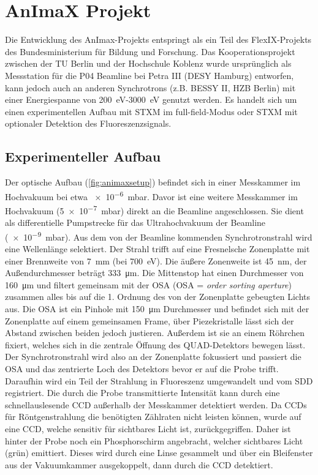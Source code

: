 \section{AnImaX Projekt}
Die Entwicklung des AnImax-Projekts entspringt als ein Teil des FlexIX-Projekts des Bundesministerium für Bildung und Forschung. Das Kooperationsprojekt zwischen der TU Berlin und der Hochschule Koblenz wurde ursprünglich als Messstation für die P04 Beamline bei Petra III (DESY Hamburg) entworfen, kann jedoch auch an anderen Synchrotrons (z.B. BESSY II, HZB Berlin) mit einer Energiespanne von \SI{200}{\electronvolt}-\SI{3000}{\electronvolt} genutzt werden. Es handelt sich um einen experimentellen Aufbau mit STXM im full-field-Modus oder STXM mit optionaler Detektion des Fluoreszenzsignals.
\subsection{Experimenteller Aufbau}
Der optische Aufbau (\cref{fig:animaxsetup}) befindet sich in einer Messkammer im Hochvakuum bei etwa \SI{e-6}{\milli\bar}. Davor ist eine weitere Messkammer im Hochvakuum (\SI{5e-7}{\milli\bar}) direkt an die Beamline angeschlossen. Sie dient als differentielle Pumpstrecke für das Ultrahochvakuum der Beamline (\SI{e-9}{\milli\bar}). Aus dem von der Beamline kommenden Synchrotronstrahl wird eine Wellenlänge selektiert. Der Strahl trifft auf eine Fresnelsche Zonenplatte mit einer Brennweite von \SI{7}{\milli\meter} (bei \SI{700}{\electronvolt}). Die äußere Zonenweite ist \SI{45}{\nano\meter}, der Außendurchmesser beträgt \SI{333}{\micro\meter}. Die Mittenstop hat einen Durchmesser von \SI{160}{\micro\meter} und filtert gemeinsam mit der OSA (OSA = \textit{order sorting aperture}) zusammen alles bis auf die 1. Ordnung des von der Zonenplatte gebeugten Lichts aus. Die OSA ist ein Pinhole mit \SI{150}{\micro\meter} Durchmesser und befindet sich mit der Zonenplatte auf einem gemeinsamen Frame, über Piezekristalle lässt sich der Abstand zwischen beiden jedoch justieren. Außerdem ist sie an einem Röhrchen fixiert, welches sich in die zentrale Öffnung des QUAD-Detektors bewegen lässt. Der Synchrotronstrahl wird also an der Zonenplatte fokussiert und passiert die OSA und das zentrierte Loch des Detektors bevor er auf die Probe trifft. Daraufhin wird ein Teil der Strahlung in Fluoreszenz umgewandelt und vom SDD registriert. Die durch die Probe transmittierte Intensität kann durch eine schnellauslesende CCD außerhalb der Messkammer detektiert werden. Da CCDs für Röntgenstrahlung die benötigten Zählraten nicht leisten können, wurde auf eine CCD, welche sensitiv für sichtbares Licht ist, zurückgegriffen. Daher ist hinter der Probe noch ein Phosphorschirm angebracht, welcher sichtbares Licht (grün) emittiert. Dieses wird durch eine Linse gesammelt und über ein Bleifenster aus der Vakuumkammer ausgekoppelt, dann durch die CCD detektiert.

